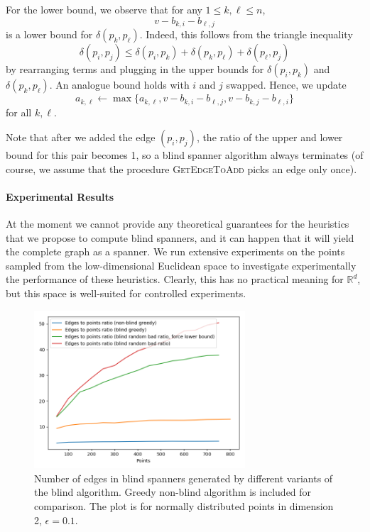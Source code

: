 \documentclass[a4paper,USenglish]{socg-lipics-v2018}
\newcommand{\R}{\mathbb{R}}
\newcommand{\eps}{\epsilon}
\newcommand{\dist}{\delta}
\begin{document}
For the lower bound, we observe that for any $1\leq k,\ell\leq n$,
\[
    v-b_{k,i}-b_{\ell,j}
\]
is a lower bound for $\dist(p_k,p_\ell)$. Indeed, this follows from
the triangle inequality
%
\[\dist(p_i,p_j)\leq \dist(p_i,p_k)+\dist(p_k,p_\ell)+\dist(p_\ell,p_j)\]
by rearranging terms and plugging in the upper bounds for $\dist(p_i,p_k)$
and $\dist(p_k,p_\ell)$. An analogue bound holds with $i$ and $j$ swapped. Hence, we update
%
\[a_{k,\ell}\gets \max\{a_{k,\ell},v-b_{k,i}-b_{\ell,j},v-b_{k,j}-b_{\ell,i}\}\]
%
for all $k,\ell$.

Note that after we added the edge $(p_i, p_j)$, the ratio of the upper and lower bound
for this pair becomes 1, so a blind spanner algorithm always terminates (of course,
we assume that the procedure \textsc{GetEdgeToAdd} picks an edge only once).


\paragraph{Experimental Results}
At the moment we cannot provide any theoretical guarantees for the heuristics that we propose to compute blind spanners,
and it can happen that it will yield the complete graph as a spanner.
We run extensive experiments on the points sampled from the low-dimensional Euclidean space to investigate
experimentally the performance of these heuristics. Clearly, this has no practical meaning for $\R^d$, but
this space is well-suited for controlled experiments.

\begin{figure}[ht]
    \label{fig:spanner-sparseness}
    \includegraphics[width=0.7\textwidth]{edges_to_points_ratio_dim_2_normal_points.png}
    \caption{Number of edges in blind spanners generated by different variants of the blind
    algorithm. Greedy non-blind algorithm is included for comparison. The plot is for normally distributed points
    in dimension 2, $\eps = 0.1$.}
\end{figure}
\end{document}
